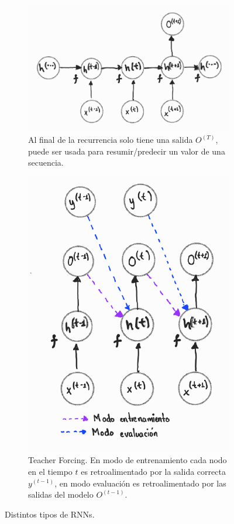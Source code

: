 \begin{figure}[h!]
    \begin{subfigure}[b]{0.4\textwidth}
        \centering
        \includegraphics[height=0.63\textwidth]{Chapters/1. Transformer/Figures/rnn/rnn_cfgc.png}
        \caption{Al final de la recurrencia solo tiene una salida $O^{(T)}$, puede ser usada para
        resumir/predecir un valor de una secuencia.}
        \label{fig:rnn_cfgc}
    \end{subfigure}
    \hfill
    \begin{subfigure}[b]{0.49\textwidth}
        \centering
        \includegraphics[height=0.6\textwidth]{Chapters/1. Transformer/Figures/rnn/rnn_cfgd.png}
        \caption{Teacher Forcing. En modo de entrenamiento cada nodo en el tiempo $t$ es
        retroalimentado por la salida correcta $y^{(t-1)}$, en modo evaluación es retroalimentado por las
        salidas del modelo $O^{(t-1)}$.}
        \label{fig:rnn_cfgd}
    \end{subfigure}

    \caption[RNN - CFG]{Distintos tipos de RNNs.}
    \label{fig:three graphs}
\end{figure}


